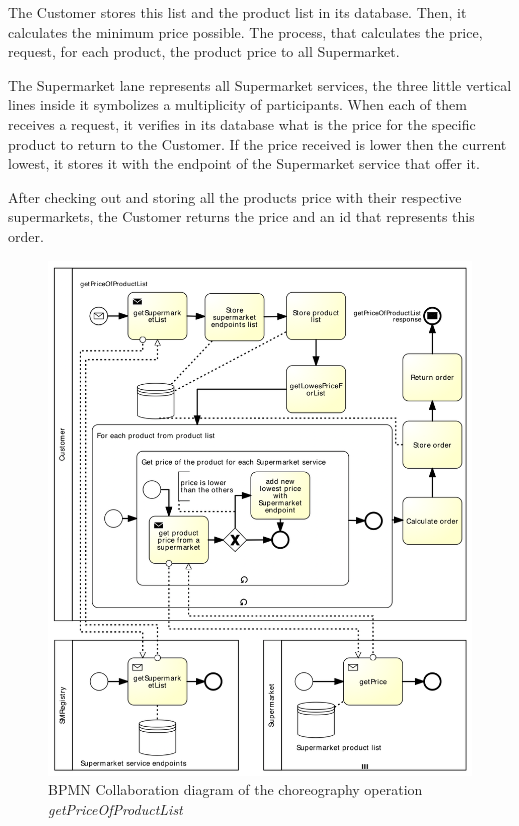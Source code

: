 The Customer stores this list and the product list in its database. Then, it calculates the minimum price possible. The process, that calculates the price, request, for each product,  the product price to all Supermarket.  

The Supermarket lane represents all Supermarket services, the three little vertical lines inside it symbolizes a multiplicity of participants. When each of them receives a request, it verifies in its database what is the price for the specific product to return to the Customer. If the price received is lower then the current lowest, it stores it with the endpoint of the Supermarket service that offer it. 

After checking out and storing all the products price with their respective supermarkets, the Customer returns the price and an id that represents this order.

\begin{figure}[htbp]
\begin{center}
	\includegraphics{images/getPriceOfProductListworkflow}
\caption{BPMN Collaboration diagram of the choreography operation \emph{getPriceOfProductList}}
\label{getPriceOfProductListworkflow}
\end{center}
\end{figure}


